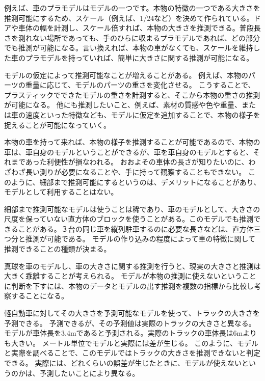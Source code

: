 例えば、車のプラモデルはモデルの一つです。本物の特徴の一つである大きさを推測可能にするため、スケール（例えば、1/24など）を決めて作られている。ドアや車体の幅を計測し、スケール倍すれば、本物の大きさを推測できる。普段長さを測れない場所であっても、手のひらに収まるプラモデルであれば、どの部分でも推測が可能になる。言い換えれば、本物の車がなくても、スケールを維持した車のプラモデルを持っていれば、簡単に大きさに関する推測が可能になる。



モデルの仮定によって推測可能なことが増えることがある。
例えば、本物のパーツの重量に応じて、モデルのパーツの重さを変化させる。
こうすることで、プラスティックでできたモデルの重さを計測すると、そこから本物の重さの推測が可能になる。
他にも推測したいこと、例えば、素材の質感や色や重量、または車の速度といった特徴なども、モデルに仮定を追加することで、本物の様子を捉えることが可能になっていく。
\fi

本物の車を持って来れば、本物の様子を推測することが可能であるので、本物の車は、車自身のモデルということができるが、車を車自身のモデルとすると、それまであった利便性が損なわれる。
おおよその車体の長さが知りたいのに、わざわざ長い測りが必要になることや、手に持って観察することもできない。
このように、細部まで推測可能にするというのは、デメリットになることがあり、モデルとして利用することはない。

細部まで推測可能なモデルは使うことは稀であり、車のモデルとして、大きさの尺度を保っていない直方体のブロックを使うことがある。このモデルでも推測できることがある。３台の同じ車を縦列駐車するのに必要な長さなどは、直方体三つ分と推測が可能である。
モデルの作り込みの程度によって車の特徴に関して推測できることの種類が決まる。

真球を車のモデルし、車の大きさに関する推測を行うと、現実の大きさと推測は大きく乖離することが考えられる。
モデルが本物の推測に使えないということに判断を下すには、本物のデータとモデルの出す推測を複数の指標から比較し考察することになる。


軽自動車に対してその大きさを予測可能なモデルを使って、トラックの大きさを予測できる。
予測できるが、その予測値は実際のトラックの大きさと異なる。
モデルが車体長を3.4mであると予測される。実際のトラックの車体長は6mよりも大きい。
メートル単位でモデルと実際には差が生じる。
このように、モデルと実際を調べることで、このモデルではトラックの大きさを推測できないと判定できる。
実際には、どれくらいの誤差が生じたときに、モデルが使えないというのかは、予測したいことにより異なる。

